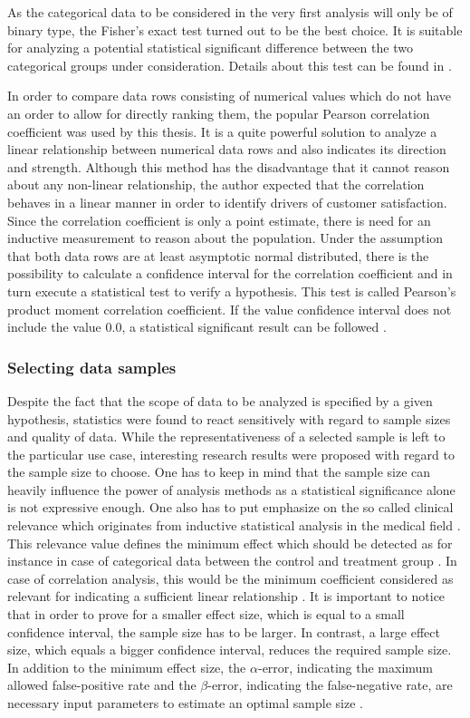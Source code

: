 As the categorical data to be considered in the very first analysis will only be of binary type, the Fisher's exact test turned out to be the best choice. It is suitable for analyzing a potential statistical significant difference between the two categorical groups under consideration. Details about this test can be found in \cite{fishers1992}. 

In order to compare data rows consisting of numerical values which do not have an order to allow for directly ranking  them, the popular Pearson correlation coefficient was used by this thesis. It is a quite powerful solution to analyze a linear relationship between numerical data rows and also indicates its direction and strength. Although this method has the disadvantage that it cannot reason about any non-linear relationship, the author expected that the correlation behaves in a linear manner in order to identify drivers of customer satisfaction. Since the correlation coefficient is only a point estimate, there is need for an inductive measurement to reason about the population. Under the assumption that both data rows are at least asymptotic normal distributed, there is the possibility to calculate a confidence interval for the correlation coefficient and in turn execute a statistical test to verify a hypothesis. This test is called Pearson's product moment correlation coefficient. If the value confidence interval does not include the value $0.0$, a statistical significant result can be followed \cite{lee1988thirteen} \cite{artusi2002bravais}. 

\subsubsection{Selecting data samples}
Despite the fact that the scope of data to be analyzed is specified by a given hypothesis, statistics were found to react sensitively with regard to sample sizes and quality of data. While the representativeness of a selected sample is left to the particular use case, interesting research results were proposed with regard to the sample size to choose. One has to keep in mind that the sample size can heavily influence the power of analysis methods as a statistical significance alone is not expressive enough. One also has to put emphasize on the so called clinical relevance which originates from inductive statistical analysis in the medical field \cite{campbell1995estimating}. This relevance value defines the minimum effect which should be detected as for instance in case of categorical data between the control and treatment group \cite{kadam2010sample}. In case of correlation analysis, this would be the minimum coefficient considered as relevant for indicating a sufficient linear relationship \cite{moinester2014sample}. It is important to notice that in order to prove for a smaller effect size, which is equal to a small confidence interval, the sample size has to be larger. In contrast, a large effect size, which equals a bigger confidence interval, reduces the required sample size. In addition to the minimum effect size, the $\alpha$-error, indicating the maximum allowed false-positive rate and the $\beta$-error, indicating the false-negative rate, are necessary input parameters to estimate an optimal sample size \cite{kadam2010sample}.

